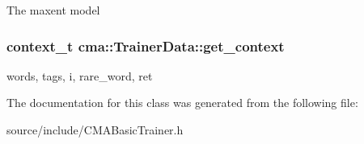The maxent model 
\subsubsection{\setlength{\rightskip}{0pt plus 5cm}context\_\-t {\bf cma::TrainerData::get\_\-context}}\label{classcma_1_1TrainerData_6a4496484d04a90c61f201011536d8c2}


words, tags, i, rare\_\-word, ret 

The documentation for this class was generated from the following file:\begin{CompactItemize}
\item 
source/include/CMABasicTrainer.h\end{CompactItemize}
